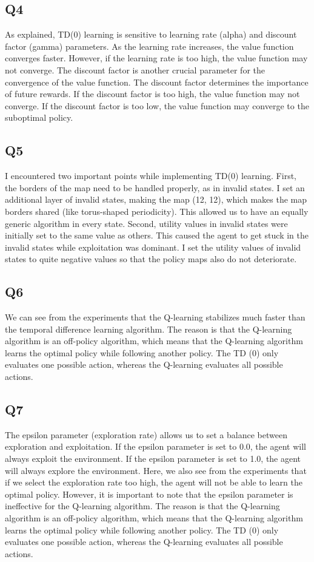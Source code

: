 \documentclass{assignment}
\begin{document}
\subsection{Q4}
As explained, TD(0) learning is sensitive to learning rate (alpha) and discount factor (gamma) parameters. As the learning rate increases, the value function converges faster. However, if the learning rate is too high, the value function may not converge. The discount factor is another crucial parameter for the convergence of the value function. The discount factor determines the importance of future rewards. If the discount factor is too high, the value function may not converge. If the discount factor is too low, the value function may converge to the suboptimal policy.

\subsection{Q5}
I encountered two important points while implementing TD(0) learning. First, the borders of the map need to be handled properly, as in invalid states. I set an additional layer of invalid states, making the map (12, 12), which makes the map borders shared (like torus-shaped periodicity). This allowed us to have an equally generic algorithm in every state. Second, utility values in invalid states were initially set to the same value as others. This caused the agent to get stuck in the invalid states while exploitation was dominant. I set the utility values of invalid states to quite negative values so that the policy maps also do not deteriorate.

\subsection{Q6}
We can see from the experiments that the Q-learning stabilizes much faster than the temporal difference learning algorithm. The reason is that the Q-learning algorithm is an off-policy algorithm, which means that the Q-learning algorithm learns the optimal policy while following another policy. The TD (0) only evaluates one possible action, whereas the Q-learning evaluates all possible actions.

\subsection{Q7}
The epsilon parameter (exploration rate) allows us to set a balance between exploration and exploitation. If the epsilon parameter is set to 0.0, the agent will always exploit the environment. If the epsilon parameter is set to 1.0, the agent will always explore the environment. Here, we also see from the experiments that if we select the exploration rate too high, the agent will not be able to learn the optimal policy. However, it is important to note that the epsilon parameter is ineffective for the Q-learning algorithm. The reason is that the Q-learning algorithm is an off-policy algorithm, which means that the Q-learning algorithm learns the optimal policy while following another policy. The TD (0) only evaluates one possible action, whereas the Q-learning evaluates all possible actions.
\end{document}
